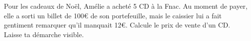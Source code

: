 %
%
	Pour les cadeaux de Noël, Amélie a acheté 5 CD à la Fnac. Au moment de payer, elle a sorti un billet de 100€ de son portefeuille, mais le caissier lui a fait gentiment remarquer qu’il
manquait 12€. Calcule le prix de vente d’un CD. Laisse ta démarche visible.
